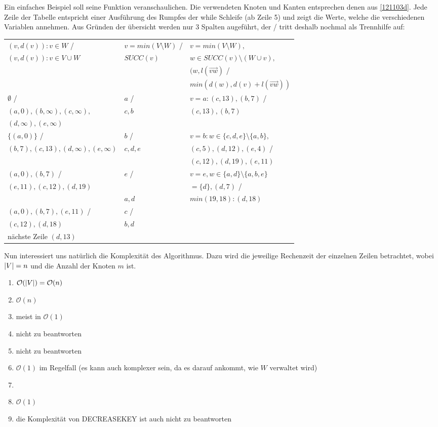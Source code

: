 \documentclass[ngerman,draft,parskip=half*,twoside]{scrreprt}
\theoremstyle{break}
\theoremstyle{nonumberbreak}
\newcommand*{\OO}{\mathcal{O}}      %
\DeclarePairedDelimiter{\abs}{\lvert}{\rvert}
\begin{document}
Ein einfaches Beispiel soll seine Funktion veranschaulichen. Die verwendeten Knoten und Kanten entsprechen denen
aus \autoref{121103d}. Jede Zeile der Tabelle entspricht einer Ausführung des Rumpfes der while Schleife (ab Zeile 5)
und zeigt die Werte, welche die verschiedenen Variablen annehmen. Aus Gründen der übersicht werden nur 3 Spalten
augeführt, der / tritt deshalb nochmal als Trennhilfe auf:

\begin{tabular}{|l|l|l|}\hline
$(v,d(v)):v \in W$ /		& $v = min(V \setminus W)$ /	& $v=min(V \setminus W),$ \\
$ (v,d(v)): v \in V\cup W$	& $SUCC(v)$		& $w \in SUCC(v)\setminus (W\cup {v}),$ \\
				&			& $(w,l(\vec{vw})$ / \\
				&			& $min(d(w),d(v)+l(\vec{vw}))$ \\ \hline

$\emptyset$ /			& $a$ /			& $v=a:(c,13),(b,7)$ / \\
$(a,0),(b,\infty),(c,\infty),$	& $c,b$			& $(c,13),(b,7)$ \\
$(d,\infty),(e,\infty)$		& 			& \\ \hline

$\{(a,0)\}$ /			& $b$ /			& $v=b:w\in \{c,d,e\}\setminus \{a,b\},$ \\
$(b,7),(c,13),(d,\infty),(e,\infty)$ & $c,d,e$		& $(c,5),(d,12),(e,4)$ / \\
				&			& $(c,12),(d,19),(e,11)$ \\ \hline

$(a,0),(b,7)$ /			& $e$ /			& $v=e, w\in\{a,d\}\setminus \{a,b,e\}$ \\
$(e,11),(c,12),(d,19)$		&			& $=\{d\}, (d,7)$ / \\
				& $a,d$			& $min(19,18):(d,18)$ \\ \hline

$(a,0),(b,7),(e,11)$ /		& $c$ /			& \\
$(c,12),(d,18)$			& $b,d$			& \\
nächste Zeile $(d,13)$		&			& \\ \hline
\end{tabular}


Nun interessiert uns natürlich die Komplexität des Algorithmus. Dazu wird die jeweilige Rechenzeit
der einzelnen Zeilen betrachtet, wobei $\abs{V}=n$ und die Anzahl der
Knoten $m$ ist.
\begin{enumerate}
\item $\OO(\abs{V}) = \OO(n)$
\item $\OO(n)$
\item meist in $\OO(1)$
\item nicht zu beantworten
\item nicht zu beantworten
\item $\OO(1)$ im Regelfall (es kann auch komplexer sein, da es darauf ankommt, wie $W$ verwaltet wird)
\item
\item $\OO(1)$
\item die Komplexität von DECREASEKEY ist auch nicht zu beantworten
\end{enumerate}
\end{document}
